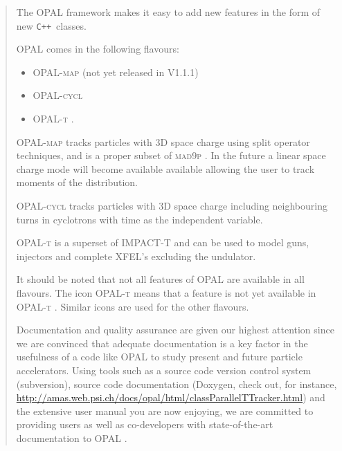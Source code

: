\documentclass[12pt,a4paper]{report}
\newcommand{\madninep}{\textsc{mad9p }}
\newcommand{\opal}{\textsc{OPAL }}
\newcommand{\opalt}{\textsc{OPAL-t }}
\newcommand{\opalcycl}{\textsc{OPAL-cycl }}
\newcommand{\opalmap}{\textsc{OPAL-map }}
\newcommand{\noopalt}{\leftthumbsdown \opalt }
\begin{document}
\begin{titlepage}
\begin{quotation}
The \opal framework makes it easy to add new features in the form of new
\texttt{C++}~classes.

OPAL comes in the following flavours:
\begin{itemize}
\item \opalmap (not yet released in V1.1.1)
\item \opalcycl 
\item \opalt .
\end{itemize}

\opalmap tracks particles with 3D space charge using split operator techniques, and is a proper subset of \madninep. In the future 
a linear space charge mode will become available available
allowing the user to track moments of the distribution. 

\opalcycl tracks particles with 3D space charge including neighbouring turns in cyclotrons
with time as the independent variable. 

\opalt is a superset of IMPACT-T \cite{qiang2005} and can be used to model guns, injectors and complete XFEL's excluding the undulator.

It should be noted that not all features of \opal are available in all flavours. The icon \noopalt means that a feature is not yet 
available in \opalt. Similar icons are used for the other flavours. 

Documentation and quality assurance are given our highest attention since we are convinced that adequate documentation 
is a key factor in the usefulness of a code like \opal to study present and future particle accelerators. 
 Using tools such as a source code version
control system (subversion), source code documentation (Doxygen, check out, for instance,  \url{http://amas.web.psi.ch/docs/opal/html/classParallelTTracker.html}) and the extensive user manual
you are now enjoying, we are committed to providing users as well as co-developers with 
state-of-the-art documentation to \opal.

\end{quotation}
\vfill
\end{titlepage}

\tableofcontents
\listoftables
\listoffigures



 













\appendix




\printindex
\end{document}
